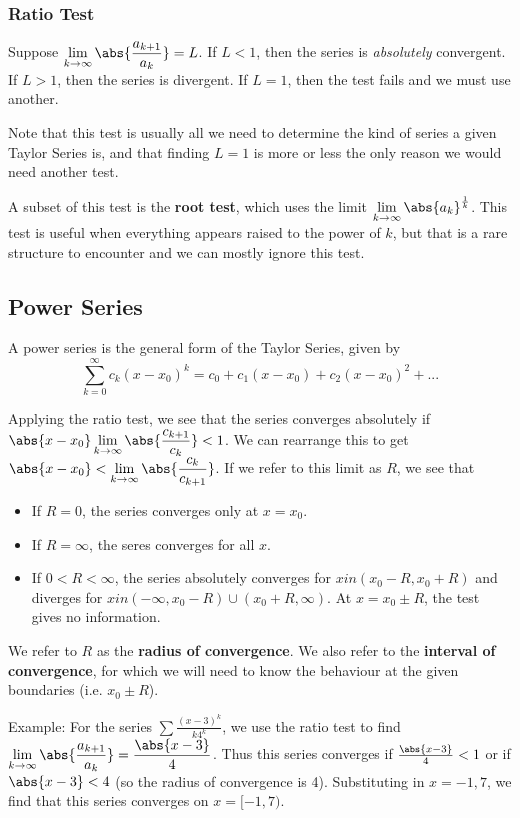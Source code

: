 \documentclass[12pt]{article}
\begin{document}
\subsubsection*{Ratio Test}
Suppose $\displaystyle\lim_{k\to\infty} \abs{\frac{a_{k+1}}{a_k}} = L$. If $L < 1$, then the series is \emph{absolutely} convergent. If $L > 1$, then the series is divergent. If $L = 1$, then the test fails and we must use another.

Note that this test is usually all we need to determine the kind of series a given Taylor Series is, and that finding $L = 1$ is more or less the only reason we would need another test.

A subset of this test is the {\bf root test}, which uses the limit $\displaystyle\lim_{k\to\infty} \abs{a_k}^\frac{1}{k}$. This test is useful when everything appears raised to the power of $k$, but that is a rare structure to encounter and we can mostly ignore this test.

\subsection*{Power Series}
A power series is the general form of the Taylor Series, given by \[ \sum_{k=0}^\infty c_k (x - x_0)^k = c_0 + c_1(x-x_0) + c_2(x-x_0)^2 + ... \]

Applying the ratio test, we see that the series converges absolutely if $\abs{x - x_0} \displaystyle\lim_{k\to\infty} \abs{\frac{c_{k+1}}{c_k}} < 1$. We can rearrange this to get $\abs{x - x_0} < \displaystyle\lim_{k\to\infty} \abs{\frac{c_k}{c_{k+1}}}$. If we refer to this limit as $R$, we see that
\begin{itemize}
\item If $R = 0$, the series converges only at $x = x_0$.
\item If $R = \infty$, the seres converges for all $x$.
\item If $0 < R < \infty$, the series absolutely converges for $x in (x_0 - R, x_0 + R)$ and diverges for $x in (-\infty,x_0 - R) \cup (x_0 + R, \infty)$. At $x = x_0 \pm R$, the test gives no information.
\end{itemize}

We refer to $R$ as the {\bf radius of convergence}. We also refer to the {\bf interval of convergence}, for which we will need to know the behaviour at the given boundaries (i.e. $x_0 \pm R$).

Example: For the series $\sum \frac{(x-3)^k}{k4^k}$, we use the ratio test to find $\displaystyle\lim_{k\to\infty} \abs{\frac{a_{k+1}}{a_k}} = \frac{\abs{x-3}}{4}$. Thus this series converges if $
\frac{\abs{x-3}}{4} < 1$ or if $\abs{x-3} < 4$ (so the radius of convergence is 4). Substituting in $x = -1, 7$, we find that this series converges on $x = [-1, 7)$.
\end{document}
